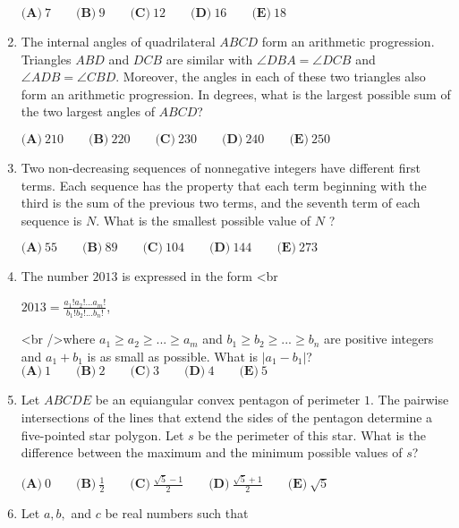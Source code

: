 \documentclass{article}
\begin{document}
\begin{enumerate}[label=\arabic*., itemsep=0.5em]
\(\textbf{(A)}\ 7 \qquad \textbf{(B)}\ 9 \qquad \textbf{(C)}\ 12 \qquad \textbf{(D)}\ 16 \qquad \textbf{(E)}\ 18\)\par \vspace{0.5em}\item The internal angles of quadrilateral \(ABCD\) form an arithmetic progression. Triangles \(ABD\) and \(DCB\) are similar with \(\angle DBA = \angle DCB\) and \(\angle ADB = \angle CBD\). Moreover, the angles in each of these two triangles also form an arithmetic progression. In degrees, what is the largest possible sum of the two largest angles of \(ABCD\)?

\(\textbf{(A)}\ 210 \qquad \textbf{(B)}\ 220 \qquad \textbf{(C)}\ 230 \qquad \textbf{(D)}\ 240 \qquad \textbf{(E)}\ 250\)\par \vspace{0.5em}\item Two non-decreasing sequences of nonnegative integers have different first terms. Each sequence has the property that each term beginning with the third is the sum of the previous two terms, and the seventh term of each sequence is \(N\). What is the smallest possible value of \(N\) ?

\(\textbf{(A)}\ 55 \qquad \textbf{(B)}\ 89 \qquad \textbf{(C)}\ 104 \qquad \textbf{(D)}\ 144 \qquad \textbf{(E)}\ 273\)\par \vspace{0.5em}\item The number \(2013\) is expressed in the form <br \> \begin{center}
 \(2013 = \frac {a_1!a_2!...a_m!}{b_1!b_2!...b_n!}\),
\end{center}<br />where \(a_1 \ge a_2 \ge ... \ge a_m\) and \(b_1 \ge b_2 \ge ... \ge b_n\) are positive integers and \(a_1 + b_1\) is as small as possible. What is \(|a_1 - b_1|\)?
\(\textbf{(A)}\ 1 \qquad \textbf{(B)}\ 2 \qquad \textbf{(C)}\ 3 \qquad \textbf{(D)}\ 4 \qquad \textbf{(E)}\ 5\)\par \vspace{0.5em}\item Let \(ABCDE\) be an equiangular convex pentagon of perimeter \(1\). The pairwise intersections of the lines that extend the sides of the pentagon determine a five-pointed star polygon. Let \(s\) be the perimeter of this star. What is the difference between the maximum and the minimum possible values of \(s\)?

\(\textbf{(A)}\ 0 \qquad \textbf{(B)}\ \frac{1}{2} \qquad \textbf{(C)}\ \frac{\sqrt{5}-1}{2} \qquad \textbf{(D)}\  \frac{\sqrt{5}+1}{2} \qquad \textbf{(E)}\ \sqrt{5}\)\par \vspace{0.5em}\item Let \(a,b,\) and \(c\) be real numbers such that 



\end{enumerate}
\end{document}
